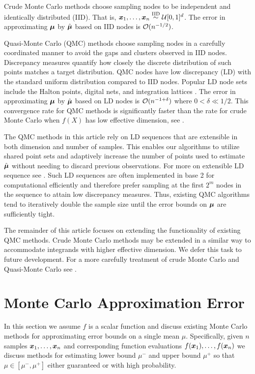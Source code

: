\documentclass{article}[12pt]
\begin{document}
Crude Monte Carlo methods choose sampling nodes to be independent and identically distributed (IID). That is, $\boldsymbol{x}_1,\dots,\boldsymbol{x}_n \overset{\text{IID}}{\sim} \mathcal{U}[0,1]^d$.
The error in approximating $\boldsymbol{\mu}$ by $\hat{\boldsymbol{\mu}}$ based on IID nodes is  $\mathcal{O}(n^{-1/2})$. 

Quasi-Monte Carlo (QMC) methods choose sampling nodes in a carefully coordinated manner to avoid the gaps and clusters observed in IID nodes.  Discrepancy measures quantify how closely the discrete distribution of such points matches a target distribution. QMC nodes have low discrepancy (LD) with the standard uniform distribution compared to IID nodes. Popular LD node sets include the Halton points, digital nets, and integration lattices . The error in approximating $\boldsymbol{\mu}$ by $\hat{\boldsymbol{\mu}}$ based on LD nodes is  $\mathcal{O}(n^{-1+\delta})$ where $0 < \delta \ll 1/2$. This convergence rate for QMC methods is significantly faster than the rate for crude Monte Carlo when $f(X)$ has low effective dimension, see . 

The QMC methods in this article rely on LD sequences that are extensible in both dimension and number of samples. This enables our algorithms to utilize shared point sets and adaptively increase the number of points used to estimate $\hat{\boldsymbol{\mu}}$ without needing to discard previous observations. For more on extensible LD sequence see . Such LD sequences are often implemented in base 2 for computational efficiently and therefore prefer sampling at the first $2^m$ nodes in the sequence to attain low discrepancy measures. Thus, existing QMC algorithms tend to iteratively  double the sample size until the error bounds on $\boldsymbol{\mu}$ are sufficiently tight. 

The remainder of this article focuses on extending the functionality of existing QMC methods. Crude Monte Carlo methods may be extended in a similar way to accommodate integrands with higher effective dimension. We defer this task to future development.  For a more carefully treatment of crude Monte Carlo and Quasi-Monte Carlo see \cite{mcbook}. 

\section{Monte Carlo Approximation Error}\label{sec:Existing_QMC_Methods}

In this section we assume $f$ is a scalar function and discuss existing Monte Carlo methods for approximating error bounds on a single mean $\mu$. Specifically, given $n$ samples $\boldsymbol{x}_1,\dots,\boldsymbol{x}_n$ and  corresponding function evaluations $f(\boldsymbol{x}_1),\dots,f(\boldsymbol{x}_n)$ we discuss methods for estimating lower bound $\mu^-$ and upper bound $\mu^+$ so that $\mu \in [\mu^-,\mu^+]$ either guaranteed or with high probability. 
\end{document}
